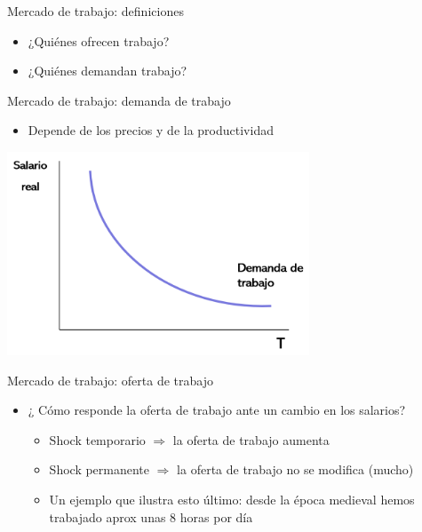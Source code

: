 \documentclass{beamer}
\begin{document}









\begin{frame}{ Mercado de trabajo: definiciones}
\begin{itemize}
    \item ¿Quiénes ofrecen trabajo?
    \vspace{2mm}
    \item ¿Quiénes demandan trabajo?
\end{itemize} 
\end{frame}


\begin{frame}{Mercado de trabajo: demanda de trabajo}
\begin{itemize}
\item Depende de los precios y de la productividad 
\end{itemize}
\centering\includegraphics[width=9cm]{Figures/P27.png}\
\end{frame}


\begin{frame}{Mercado de trabajo: oferta de trabajo}

\begin{itemize}
    \item ¿ Cómo responde la oferta de trabajo ante un cambio en los salarios?
    \vspace{2mm}
    \begin{itemize}
    \item Shock temporario $\Rightarrow$ la oferta de trabajo aumenta \vspace{1mm}
    \item Shock permanente $\Rightarrow$ la oferta de trabajo no se modifica (mucho) \vspace{1mm}
   \item Un ejemplo que ilustra esto último: desde la época medieval hemos trabajado aprox unas 8 horas por día
    \end{itemize}
\end{itemize}
\end{frame}
\end{document}
